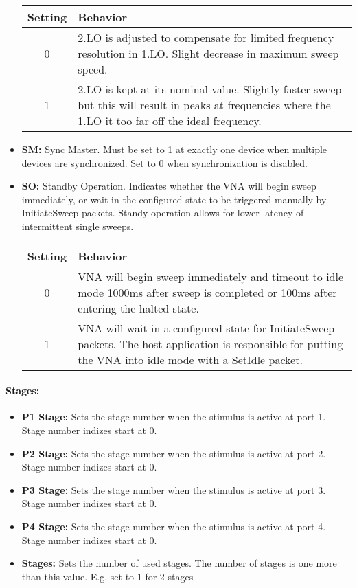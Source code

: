 \documentclass[a4paper,11pt]{article}
\newcommand{\bitrect}[2]{
  \begin{pgfonlayer}{foreground}
    \draw [thick] (0,0) rectangle (#1,1);
    \pgfmathsetmacro\result{#1-1}
    \foreach \x in {1,...,\result}
      \draw [thick] (\x,1) -- (\x, 0.8);
  \end{pgfonlayer}
  \bitlabels{#1}{#2}
}
\newcommand{\rwbits}[3]{
  \draw [thick] (#1,0) rectangle ++(#2,1) node[pos=0.5]{#3};
  \pgfmathsetmacro\start{#1+0.5}
  \pgfmathsetmacro\finish{#1+#2-0.5}
}
\newcommand{\robits}[3]{
  \begin{pgfonlayer}{background}
    \draw [thick, fill=lightgray] (#1,0) rectangle ++(#2,1) node[pos=0.5]{#3};
  \end{pgfonlayer}
  \pgfmathsetmacro\start{#1+0.5}
  \pgfmathsetmacro\finish{#1+#2-0.5}
}
\newcommand{\bitlabels}[2]{
  \foreach \bit in {1,...,#1}{
     \pgfmathsetmacro\result{#2}
     \node [above] at (\bit-0.5, 1) {\pgfmathprintnumber{\result}};
   }
}
\begin{document}
\begin{itemize}
\begin{center}
\begin{tabularx}{\textwidth}{ c|X }
Setting & Behavior\\
 \hline
0 & 2.LO is adjusted to compensate for limited frequency resolution in 1.LO. Slight decrease in maximum sweep speed. \\
1 & 2.LO is kept at its nominal value. Slightly faster sweep but this will result in peaks at frequencies where the 1.LO it too far off the ideal frequency. \\
\end{tabularx}
\end{center}
\item \textbf{SM:} Sync Master. Must be set to 1 at exactly one device when multiple devices are synchronized. Set to 0 when synchronization is disabled.
\item \textbf{SO:} Standby Operation. Indicates whether the VNA will begin sweep immediately, or wait in the configured state to be triggered manually by InitiateSweep packets. Standy operation allows for lower latency of intermittent single sweeps.
\begin{center}
\begin{tabularx}{\textwidth}{ c|X }
Setting & Behavior\\
 \hline
0 & VNA will begin sweep immediately and timeout to idle mode 1000ms after sweep is completed or 100ms after entering the halted state. \\
1 & VNA will wait in a configured state for InitiateSweep packets. The host application is responsible for putting the VNA into idle mode with a SetIdle packet.\\
\end{tabularx}
\end{center}
\end{itemize}

\paragraph{Stages:}
\begin{center}
\end{center}
\begin{itemize}
\item \textbf{P1 Stage:} Sets the stage number when the stimulus is active at port 1. Stage number indizes start at 0.
\item \textbf{P2 Stage:} Sets the stage number when the stimulus is active at port 2. Stage number indizes start at 0.
\item \textbf{P3 Stage:} Sets the stage number when the stimulus is active at port 3. Stage number indizes start at 0.
\item \textbf{P4 Stage:} Sets the stage number when the stimulus is active at port 4. Stage number indizes start at 0.
\item \textbf{Stages:} Sets the number of used stages. The number of stages is one more than this value. E.g. set to 1 for 2 stages
\end{itemize}
\end{document}
